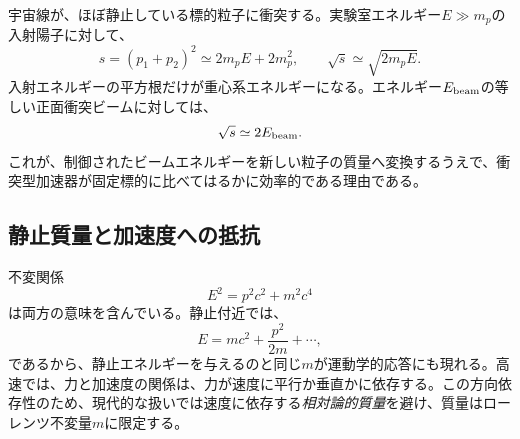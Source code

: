 宇宙線が、ほぼ静止している標的粒子に衝突する。実験室エネルギー\(E\gg m_p\)の入射陽子に対して、
\begin{equation}
  s=(p_1+p_2)^2
  \simeq2m_pE+2m_p^2,
  \qquad
  \sqrt{s}\simeq\sqrt{2m_pE}.
  \label{eq:l09-fixed-target-s}
\end{equation}
入射エネルギーの平方根だけが重心系エネルギーになる。エネルギー\(E_{\rm beam}\)の等しい正面衝突ビームに対しては、
\begin{equation}
  \sqrt{s}\simeq2E_{\rm beam}.
  \label{eq:l09-collider-s}
\end{equation}
これが、制御されたビームエネルギーを新しい粒子の質量へ変換するうえで、衝突型加速器が固定標的に比べてはるかに効率的である理由である。

\begin{classroomqa}
\end{classroomqa}

\subsection{静止質量と加速度への抵抗}

\begin{classroomqa}
\end{classroomqa}

不変関係
\begin{equation}
  E^2=p^2c^2+m^2c^4
  \label{eq:l09-energy-momentum}
\end{equation}
は両方の意味を含んでいる。静止付近では、
\begin{equation}
  E=mc^2+\frac{p^2}{2m}+\cdots,
\end{equation}
であるから、静止エネルギーを与えるのと同じ\(m\)が運動学的応答にも現れる。高速では、力と加速度の関係は、力が速度に平行か垂直かに依存する。この方向依存性のため、現代的な扱いでは速度に依存する\emph{相対論的質量}を避け、質量はローレンツ不変量\(m\)に限定する。


